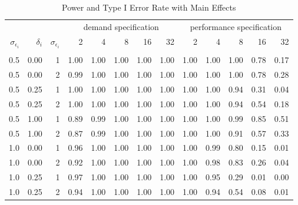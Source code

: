 \begin{table}

\caption{\label{tab:big-main-table}Power and Type I Error Rate with Main Effects}
\centering
\fontsize{9}{11}\selectfont
\begin{threeparttable}
\begin{tabular}[t]{rrrrrrrrrrrrr}
\toprule
\multicolumn{3}{c}{ } & \multicolumn{5}{c}{demand specification} & \multicolumn{5}{c}{performance specification} \\
\cmidrule(l{3pt}r{3pt}){4-8} \cmidrule(l{3pt}r{3pt}){9-13}
$\sigma_{\epsilon_i}$ & $\delta_i$ & $\sigma_{\epsilon_i}$ & 2 & 4 & 8 & 16 & 32 & 2 & 4 & 8 & 16 & 32\\
\midrule
\addlinespace[0.3em]
\multicolumn{13}{c}{\textbf{Power}}\\
\hspace{1em}0.5 & 0.00 & 1 & 1.00 & 1.00 & 1.00 & 1.00 & 1.00 & 1.00 & 1.00 & 1.00 & 0.78 & 0.17\\
\hspace{1em}0.5 & 0.00 & 2 & 0.99 & 1.00 & 1.00 & 1.00 & 1.00 & 1.00 & 1.00 & 1.00 & 0.78 & 0.28\\
\hspace{1em}0.5 & 0.25 & 1 & 1.00 & 1.00 & 1.00 & 1.00 & 1.00 & 1.00 & 1.00 & 0.94 & 0.31 & 0.04\\
\hspace{1em}0.5 & 0.25 & 2 & 1.00 & 1.00 & 1.00 & 1.00 & 1.00 & 1.00 & 1.00 & 0.94 & 0.54 & 0.18\\
\hspace{1em}0.5 & 1.00 & 1 & 0.89 & 0.99 & 1.00 & 1.00 & 1.00 & 1.00 & 1.00 & 0.99 & 0.85 & 0.51\\
\hspace{1em}0.5 & 1.00 & 2 & 0.87 & 0.99 & 1.00 & 1.00 & 1.00 & 1.00 & 1.00 & 0.91 & 0.57 & 0.33\\
\hspace{1em}1.0 & 0.00 & 1 & 0.96 & 1.00 & 1.00 & 1.00 & 1.00 & 1.00 & 0.99 & 0.80 & 0.15 & 0.01\\
\hspace{1em}1.0 & 0.00 & 2 & 0.92 & 1.00 & 1.00 & 1.00 & 1.00 & 1.00 & 0.98 & 0.83 & 0.26 & 0.04\\
\hspace{1em}1.0 & 0.25 & 1 & 0.97 & 1.00 & 1.00 & 1.00 & 1.00 & 1.00 & 0.95 & 0.29 & 0.01 & 0.00\\
\hspace{1em}1.0 & 0.25 & 2 & 0.94 & 1.00 & 1.00 & 1.00 & 1.00 & 1.00 & 0.94 & 0.54 & 0.08 & 0.01\\

\end{tabular}
\end{threeparttable}
\end{table}
